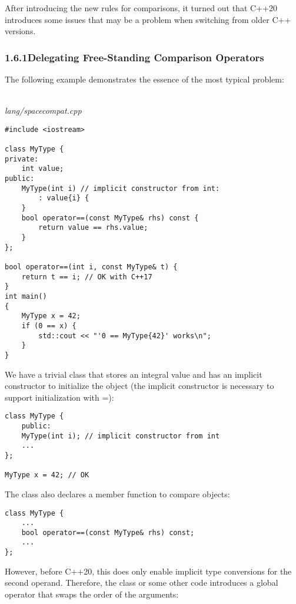 
After introducing the new rules for comparisons, it turned out that C++20 introduces some issues that may be a problem when switching from older C++ versions.

\subsubsection*{ 1.6.1\hspace{0.2cm}Delegating Free-Standing Comparison Operators}

The following example demonstrates the essence of the most typical problem:

\noindent
\hspace*{\fill} \\ %
\textit{lang/spacecompat.cpp}

\begin{lstlisting}[style=styleCXX]
#include <iostream>

class MyType {
private:
	int value;
public:
	MyType(int i) // implicit constructor from int:
		: value{i} {
	}
	bool operator==(const MyType& rhs) const {
		return value == rhs.value;
	}
};

bool operator==(int i, const MyType& t) {
	return t == i; // OK with C++17
}
int main()
{
	MyType x = 42;
	if (0 == x) {
		std::cout << "'0 == MyType{42}' works\n";
	}
}
\end{lstlisting}

We have a trivial class that stores an integral value and has an implicit constructor to initialize the object (the implicit constructor is necessary to support initialization with =):

\begin{lstlisting}[style=styleCXX]
class MyType {
	public:
	MyType(int i); // implicit constructor from int
	...
};

MyType x = 42; // OK
\end{lstlisting}

The class also declares a member function to compare objects:

\begin{lstlisting}[style=styleCXX]
class MyType {
	...
	bool operator==(const MyType& rhs) const;
	...
};
\end{lstlisting}

However, before C++20, this does only enable implicit type conversions for the second operand. Therefore, the class or some other code introduces a global operator that swaps the order of the arguments:

